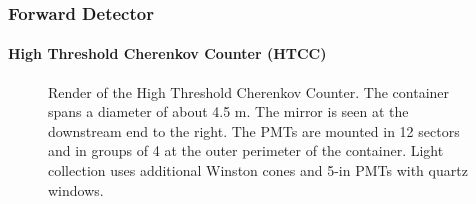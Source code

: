\subsubsection{Forward Detector} \label{sssec::forwarddetector}

\paragraph{High Threshold Cherenkov Counter (HTCC)}
    \begin{figure}
        \centering{}
        \caption[HTCC]{Render of the High Threshold Cherenkov Counter.
        The container spans a diameter of about 4.5 m. The mirror is seen at the downstream end to the right.
        The PMTs are mounted in 12 sectors and in groups of 4 at the outer perimeter of the container.
        Light collection uses additional Winston cones and 5-in PMTs with quartz windows.}
        \label{fig::htcc}
    \end{figure}

